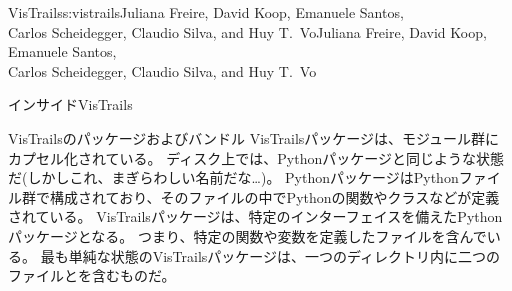 \begin{aosachaptertoc}{VisTrails}{s:vistrails}{Juliana Freire, David Koop, Emanuele Santos, \\ Carlos Scheidegger, Claudio Silva, and Huy T.\ Vo}{Juliana Freire, David Koop, Emanuele Santos, \\ \hspace*{0.9cm} Carlos Scheidegger, Claudio Silva, and Huy T.\ Vo}
\begin{aosasect1}{インサイドVisTrails}
\begin{aosasect2}{VisTrailsのパッケージおよびバンドル}
VisTrailsパッケージは、モジュール群にカプセル化されている。
ディスク上では、Pythonパッケージと同じような状態だ(しかしこれ、まぎらわしい名前だな…)。
PythonパッケージはPythonファイル群で構成されており、そのファイルの中でPythonの関数やクラスなどが定義されている。
VisTrailsパッケージは、特定のインターフェイスを備えたPythonパッケージとなる。
つまり、特定の関数や変数を定義したファイルを含んでいる。
最も単純な状態のVisTrailsパッケージは、一つのディレクトリ内に二つのファイルとを含むものだ。


\end{aosasect2}
\end{aosasect1}
\end{aosachaptertoc}
